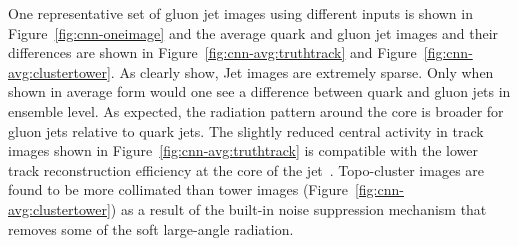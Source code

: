 One representative set of gluon jet images using different inputs is shown in Figure~\ref{fig:cnn-oneimage} and the average quark and gluon jet images and their differences are shown in Figure~\ref{fig:cnn-avg:truthtrack} and Figure~\ref{fig:cnn-avg:clustertower}. As clearly show, Jet images are extremely sparse. Only when shown in average form would one see a difference between quark and gluon jets in ensemble level. As expected, the radiation pattern around the core is broader for gluon jets relative to quark jets.
The slightly reduced central activity in track images shown in Figure~\ref{fig:cnn-avg:truthtrack} is compatible with the lower track reconstruction efficiency at the core of the jet~\cite{Aaboud:2017all}.
Topo-cluster images are found to be more collimated than tower images (Figure~\ref{fig:cnn-avg:clustertower}) as a result of the built-in noise suppression mechanism that removes some of the soft large-angle radiation.


